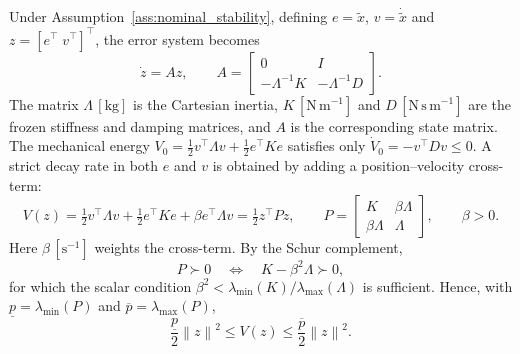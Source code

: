 \documentclass[11pt,a4paper]{article}
\newcommand{\norm}[1]{\left\lVert#1\right\rVert}
\newcommand{\unit}[1]{\,[\mathrm{#1}]}
\begin{document}
Under Assumption~\ref{ass:nominal_stability}, defining
$e=\tilde x$, $v=\dot{\tilde x}$ and
$z=[e^\top\;v^\top]^\top$, the error system becomes
\begin{equation}
\dot z=A z,\qquad
A=
\begin{bmatrix}
0&I\\
-\Lambda^{-1}K&-\Lambda^{-1}D
\end{bmatrix}.
\label{eq:error_state}
\end{equation}
The matrix $\Lambda\unit{kg}$ is the Cartesian inertia,
$K\unit{N\,m^{-1}}$ and $D\unit{N\,s\,m^{-1}}$ are the frozen stiffness and
damping matrices, and $A$ is the corresponding state matrix. The mechanical
energy
$V_0=\tfrac12v^\top\Lambda v+\tfrac12e^\top K e$ satisfies only
$\dot V_0=-v^\top Dv\le0$. A strict decay rate in both $e$ and $v$ is obtained
by adding a position--velocity cross-term:
\begin{equation}
V(z)=\tfrac12v^\top\Lambda v+\tfrac12e^\top K e
 +\beta e^\top\Lambda v
 =\tfrac12z^\top Pz,\qquad
P=
\begin{bmatrix}
K&\beta\Lambda\\
\beta\Lambda&\Lambda
\end{bmatrix},\qquad\beta>0 .
\label{eq:lyap}
\end{equation}
Here $\beta\unit{s^{-1}}$ weights the cross-term. By the Schur complement,
\begin{equation}
P\succ0
\quad\Longleftrightarrow\quad
K-\beta^2\Lambda\succ0,
\label{eq:P_condition}
\end{equation}
for which the scalar condition
$\beta^2<\lambda_{\min}(K)/\lambda_{\max}(\Lambda)$ is sufficient. Hence,
with $\underline p=\lambda_{\min}(P)$ and
$\overline p=\lambda_{\max}(P)$,
\begin{equation}
\frac{\underline p}{2}\norm{z}^2
\le V(z)\le
\frac{\overline p}{2}\norm{z}^2 .
\label{eq:V_bounds}
\end{equation}
\end{document}
